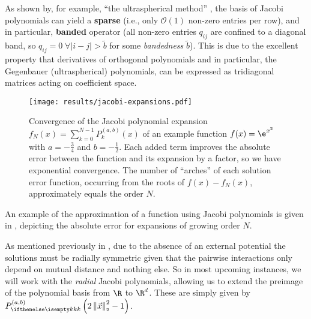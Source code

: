 As shown by, for example, ``the ultraspherical method'' \parencite{2013-a-fast-and-well-conditioned-spectral-method}, the basis of Jacobi polynomials can yield a \textbf{sparse} (i.e., only $\mathcal{O}(1)$ non-zero entries per row), and in particular, \textbf{banded} operator (all non-zero entries $q_{ij}$ are confined to a diagonal band, so $q_{ij} = 0 \;\forall |i-j| > \tilde{b}$ for some \textit{bandedness} $\tilde{b}$).
This is due to the excellent property that derivatives of orthogonal polynomials and in particular, the Gegenbauer (ultraspherical) polynomials, can be expressed as tridiagonal matrices acting on coefficient space.

\begin{figure}[H]
  \centering
  \texttt{[image: results/jacobi-expansions.pdf]}
  \caption[Convergence of Jacobi basis expansion]{Convergence of the Jacobi polynomial expansion $f_N(x) = \sum_{k=0}^{N-1} P_k^{(a, b)}(x)$ of an example function $f(x) = \e^{x^2}$ with $a = -\frac{3}{4}$ and $b = -\frac{1}{2}$. Each added term improves the absolute error between the function and its expansion by a factor, so we have exponential convergence. The number of ``arches'' of each solution error function, occurring from the roots of $f(x) - f_N(x)$, approximately equals the order $N$.}
  \label{fig:jacobi-expansions-error}
\end{figure}

An example of the approximation of a function using Jacobi polynomials is given in , depicting the absolute error for expansions of growing order $N$.

As mentioned previously in , due to the absence of an external potential the solutions must be radially symmetric given that the pairwise interactions only depend on mutual distance and nothing else.
So in most upcoming instances, we will work with the \textit{radial} Jacobi polynomials, allowing us to extend the preimage of the polynomial basis from $\R$ to $\R^d$.
These are simply given by $\jacobi[k]{x}$.

